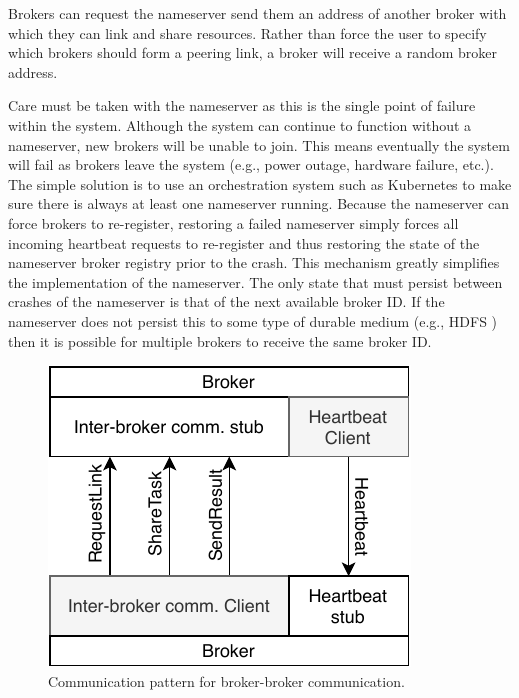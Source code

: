 \documentclass[conference]{IEEEtran}
\begin{document}
Brokers can request the nameserver send them an address of another broker with
which they can link and share resources. Rather than force the user to specify
which brokers should form a peering link, a broker will receive a random broker
address.

Care must be taken with the nameserver as this is the single point of failure
within the system. Although the system can continue to function without a
nameserver, new brokers will be unable to join. This means eventually the system
will fail as brokers leave the system (e.g., power outage, hardware failure, etc.).
The simple solution is to use an orchestration system such as Kubernetes to make
sure there is always at least one nameserver running. Because the nameserver
can force brokers to re-register, restoring a failed nameserver simply forces all
incoming heartbeat requests to re-register and thus restoring the state of the
nameserver broker registry prior to the crash. This mechanism greatly simplifies
the implementation of the nameserver. The only state that must persist between
crashes of the nameserver is that of the next available broker ID. If the nameserver
does not persist this to some type of durable medium (e.g., HDFS
\cite{Shvachko:2010:HDF:1913798.1914427}) then it is possible for multiple brokers
to receive the same broker ID.

\begin{figure}
  \centering
  \includegraphics{img/broker_broker}
  \caption{Communication pattern for broker-broker communication.}
  \label{fig:broker-broker}
\end{figure}
\end{document}
